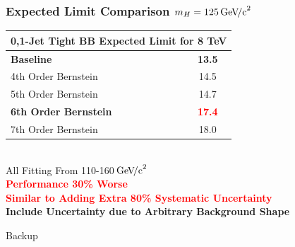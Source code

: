 \documentclass{beamer}
\newcommand{\GeVcc}{\ensuremath{\,\mathrm{Ge\kern -0.1em V\!/c}^2}}
\newcommand{\tredbf}[1]{\textcolor{red}{\bf #1}}
\begin{document}
\begin{frame}
\frametitle{Expected Limit Comparison $m_H=125\GeVcc{}$}
\begin{center}
\begin{tabular}{|l|c|} \hline
\multicolumn{2}{|c|}{ \bf 0,1-Jet Tight BB Expected Limit for 8 TeV} \\ \hline
\bf Baseline          &      \bf 13.5   \\ \hline
4th Order Bernstein         & 14.5        \\ \hline
5th Order Bernstein         & 14.7        \\ \hline
\bf 6th Order Bernstein         & \tredbf{17.4}        \\ \hline
7th Order Bernstein         & 18.0        \\ \hline
\end{tabular}
\\
All Fitting From 110-160\GeVcc{}
\\ \vspace{1em}
\large
\tredbf{
Performance 30\% Worse
\\
Similar to Adding Extra 80\% Systematic Uncertainty
}
\\
\textbf{Include Uncertainty due to Arbitrary Background Shape}
\end{center}
\end{frame}


\begin{frame}
  \begin{center}
    \Huge
    Backup
  \end{center}
\end{frame}

\end{document}
